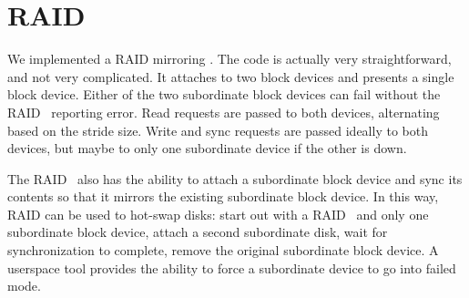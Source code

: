 \section{RAID}
\label{sec:raid}

We implemented a RAID mirroring \module. The code is actually very
straightforward, and not very complicated. It attaches to two block
devices and presents a single block device. Either of the two
subordinate block devices can fail without the RAID \module\ reporting
error. Read requests are passed to both devices, alternating based on
the stride size. Write and sync requests are passed ideally to both
devices, but maybe to only one subordinate device if the other is
down.

The RAID \module\ also has the ability to attach a subordinate block
device and sync its contents so that it mirrors the existing
subordinate block device. In this way, RAID can be used to hot-swap
disks: start out with a RAID \module\ and only one subordinate block
device, attach a second subordinate disk, wait for synchronization to
complete, remove the original subordinate block device. A userspace
tool provides the ability to force a subordinate device to go into
failed mode.
